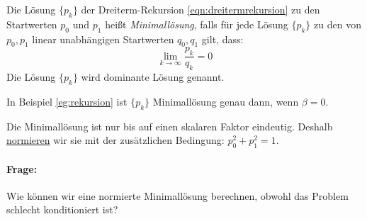 \begin{definition}[Minimallösung]
Die Lösung $\{p_k\}$ der Dreiterm-Rekursion \eqref{eqn:dreitermrekursion} zu den Startwerten $p_0$ und $p_1$ heißt \emph{Minimallösung}, falls für jede Lösung $\{p_k\}$ zu den von $p_0,p_1$ linear unabhängigen Startwerten $q_0,q_1$ gilt, dass:
\[
\lim_{k \to \infty} \frac{p_k}{q_k}=0
\]
Die Lösung $\{p_k\}$ wird dominante Lösung genannt.
\end{definition}
\begin{example}
In Beispiel \ref{eg:rekursion} ist $\{p_k\}$ Minimallösung genau dann, wenn $\beta=0$.
\end{example}
Die Minimallösung ist nur bis auf einen skalaren Faktor eindeutig. Deshalb \underline{normieren} wir sie mit der zusätzlichen Bedingung: $p_0^2+p_1^2=1$.
\paragraph{Frage:} Wie können wir eine normierte Minimallösung berechnen, obwohl das Problem schlecht konditioniert ist?
